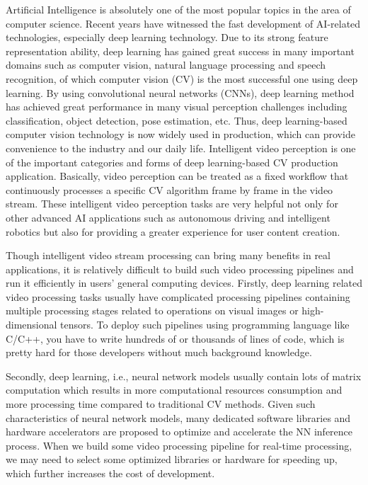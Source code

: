 
\begin{bigabstract}
Artificial Intelligence is absolutely one of the most popular topics in the area of computer science. Recent years have witnessed the fast development of AI-related technologies, especially deep learning technology. Due to its strong feature representation ability, deep learning has gained great success in many important domains such as computer vision, natural language processing and speech recognition, of which computer vision (CV) is the most successful one using deep learning. By using convolutional neural networks (CNNs), deep learning method has achieved great performance in many visual perception challenges including classification, object detection, pose estimation, etc. Thus, deep learning-based computer vision technology is now widely used in production, which can provide convenience to the industry and our daily life. Intelligent video perception is one of the important categories and forms of deep learning-based CV production application. Basically, video perception can be treated as a fixed workflow that continuously processes a specific CV algorithm frame by frame in the video stream. These intelligent video perception tasks are very helpful not only for other advanced AI applications such as autonomous driving and intelligent robotics but also for providing a greater experience for user content creation. 

Though intelligent video stream processing can bring many benefits in real applications, it is relatively difficult to build such video processing pipelines and run it efficiently in users' general computing devices. Firstly, deep learning related video processing tasks usually have complicated processing pipelines containing multiple processing stages related to operations on visual images or high-dimensional tensors. To deploy such pipelines using programming language like C/C++,  you have to write hundreds of or thousands of lines of code, which is pretty hard for those developers without much background knowledge.

Secondly, deep learning, i.e., neural network models usually contain lots of matrix computation which results in more computational resources consumption and more processing time compared to traditional CV methods. Given such characteristics of neural network models, many dedicated software libraries and hardware accelerators are proposed to optimize and accelerate the NN inference process. When we build some video processing pipeline for real-time processing, we may need to select some optimized libraries or hardware for speeding up, which further increases the cost of development.


\end{bigabstract}
